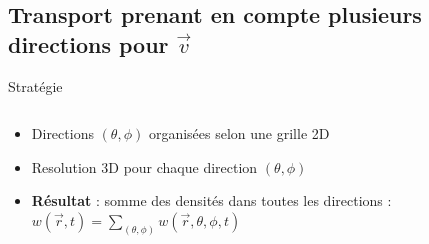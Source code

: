 \subsection{Transport prenant en compte plusieurs directions pour $\vec{v}$}
\begin{frame}{Stratégie}

  \begin{columns}[c]
    \begin{column}{6cm}
      \begin{itemize}[label=$\bullet$]
      \item Directions $(\theta,\phi)$ organisées selon une grille 2D
      \item Resolution 3D pour chaque direction $(\theta,\phi)$
      \item \textbf{Résultat} : somme des densités dans toutes les directions :\\
        $w(\vec{r},t) = \sum \limits_{(\theta,\phi)} w(\vec{r},\theta,\phi,t)$
      \end{itemize}


\end{column}
\end{columns}
\end{frame}
